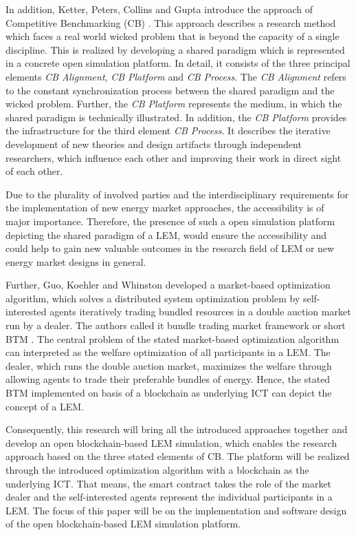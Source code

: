 In addition, Ketter, Peters, Collins and Gupta introduce the approach of Competitive Benchmarking (CB) . This approach describes a research method which faces a real world wicked problem that is beyond the capacity of a single discipline. This is realized by developing a shared paradigm which is represented in a concrete open simulation platform. In detail, it consists of the three principal elements \textit{CB Alignment}, \textit{CB Platform} and \textit{CB Process}. The \textit{CB Alignment} refers to the constant synchronization process between the shared paradigm and the wicked problem. Further, the \textit{CB Platform} represents the medium, in which the shared paradigm is technically illustrated. In addition, the \textit{CB Platform} provides the infrastructure for the third element \textit{CB Process}. It describes the iterative development of new theories and design artifacts through independent researchers, which influence each other and improving their work in direct sight of each other. 

Due to the plurality of involved parties and the interdisciplinary requirements for the implementation of new energy market approaches, the accessibility is of major importance.
Therefore, the presence of such a open simulation platform depicting the shared paradigm of a LEM, would ensure the accessibility and could help to gain new valuable outcomes in the research field of LEM or new energy market designs in general. 

Further, Guo, Koehler and Whinston developed a market-based optimization algorithm, which solves a distributed system optimization problem by self-interested agents iteratively trading bundled resources in a double auction market run by a dealer. The authors called it bundle trading market framework or short BTM . The central problem of the stated market-based optimization algorithm can interpreted as the welfare optimization of all participants in a LEM. The dealer, which runs the double auction market, maximizes the welfare through allowing agents to trade their preferable bundles of energy. Hence, the stated BTM implemented on basis of a blockchain as underlying ICT can depict the concept of a LEM.

Consequently, this research will bring all the introduced approaches together and develop an open blockchain-based LEM simulation, which enables the research approach based on the three stated elements of CB. The platform will be realized through the introduced optimization algorithm with a blockchain as the underlying ICT. That means, the smart contract takes the role of the market dealer and the self-interested agents represent the individual participants in a LEM. The focus of this paper will be on the implementation and software design of the open blockchain-based LEM simulation platform.

 